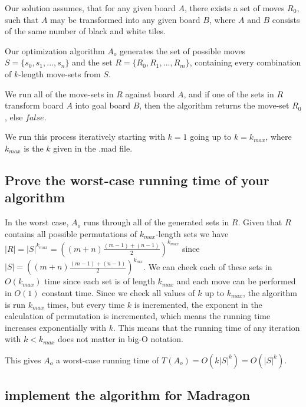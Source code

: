 \documentclass[12pt]{article}
\begin{document}
Our solution assumes, that for any given board $A$, there exists a set of moves $R_0$, such that $A$ may be transformed into any given board $B$, where $A$ and $B$ consists of the same number of black and white tiles.

Our optimization algorithm $A_o$ generates the set of possible moves $S = \{s_0, s_1, ...,s_n\}$ and the set $R = \{R_0, R_1, ..., R_m\}$, containing every combination of $k$-length move-sets from $S$.

We run all of the move-sets in $R$ against board $A$, and if one of the sets in $R$ transform board $A$ into goal board $B$, then the algorithm returns the move-set $R_0$, else $false$.

We run this process iteratively starting with $k = 1$ going up to $k = k_{max}$, where $k_{max}$ is the $k$ given in the .mad file.

\subsection{Prove the worst-case running time of your algorithm}
\label{sub:Prove the worst-case running time of your algorithm}
In the worst case, $A_o$ runs through all of the generated sets in $R$. Given that $R$ contains all possible permutations of $k_{max}$-length sets we have $|R| = |S|^{k_{max}} = ((m+n)\frac{(m-1)+(n-1)}{2})^{k_{max}}$ since $|S| = ((m+n)\frac{(m-1)+(n-1)}{2})^{k_{mx}}$. We can check each of these sets in $O(k_{max})$ time since each set is of length $k_{max}$ and each move can be performed in $O(1)$ constant time. Since we check all values of $k$ up to $k_{max}$, the algorithm is run $k_{max}$ times, but every time $k$ is incremented, the exponent in the calculation of permutation is incremented, which means the running time increases exponentially with $k$. This means that the running time of any iteration with $k < k_{max}$ does not matter in big-O notation.

This gives $A_o$ a worst-case running time of $T(A_o) = O(k|S|^k) = O(|S|^k)$.

\subsection{implement the algorithm for Madragon}
\label{sub:implement the algorithm for Madragon}
\end{document}

